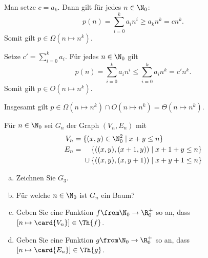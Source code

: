 \documentclass[12pt]{article}
\begin{document}
\begin{loesung}
  Man setze $c=a_k$. Dann gilt für jedes $n \in \N_0$:
  \begin{equation*}
    p(n) =    \sum_{i = 0}^k a_i n^i
         \geq a_k n^k
         =    c n^k.
  \end{equation*}
  Somit gilt $p \in \Omega(n \mapsto n^k)$.

  Setze $c' = \sum_{i = 0}^k a_i$. Für jedes $n \in \N_0$ gilt
  \begin{equation*}
    p(n) =    \sum_{i = 0}^k a_i n^i
         \leq \sum_{i = 0}^k a_i n^k
         =    c' n^k.
  \end{equation*}
  Somit gilt $p \in O(n \mapsto n^k)$.

  Insgesamt gilt $p \in \Omega(n \mapsto n^k) \cap O(n \mapsto n^k) = \Theta(n \mapsto n^k)$.
\end{loesung}


\begin{aufgabe}[4]
  Für $n\in\N_0$ sei $G_n$ der Graph $(V_n,E_n)$ mit
  \begin{align*}
    V_n &= \{ (x,y)\in\N_0^2 \mid x+y \leq n \} \\
    E_n &= \begin{aligned}[t]
      &\mathbin{\phantom{\cup}} \{ ((x,y),(x+1,y)) \mid x+1+y\leq n \} \\
      &\cup \{ ((x,y),(x,y+1)) \mid x+y+1\leq n \}
    \end{aligned}
  \end{align*}

  \begin{enumerate}[a)]
  \item Zeichnen Sie $G_3$.
  \item Für welche $n\in \N_0$ ist $G_n$ ein Baum?
  \item Geben Sie eine Funktion $f\from \N_0\to\R_0^+$ so an, dass
    $[n\mapsto \card{V_n}] \in\Th{f}$.
  \item Geben Sie eine Funktion $g\from \N_0\to\R_0^+$ so an, dass
    $[n\mapsto \card{E_n}] \in\Th{g}$.
  \end{enumerate}
\end{aufgabe}
\end{document}
